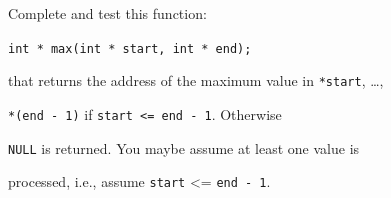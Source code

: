 Complete and test this function:



\verb!int * max(int * start, int * end);!



that returns the address of the maximum value in \texttt{*start}, \ldots,

\texttt{*(end - 1)} if \texttt{start <= end - 1}. Otherwise

\texttt{NULL} is returned. You maybe assume at least one value is

processed, i.e., assume \texttt{start} <= \texttt{end - 1}.

